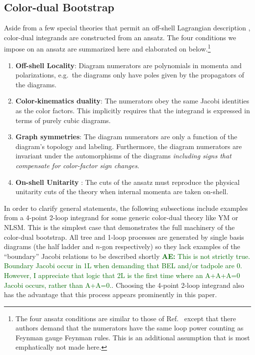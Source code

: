 \documentclass[11pt,letter]{article}
\newcommand{\ace}[1]{\textcolor{darkgreen}{\textbf{AE:}{ #1}}}
\newcommand{\eg}{e.g.~}
\begin{document}
\subsection{Color-dual Bootstrap}
\label{sec:bootstrap}

Aside from a few special theories that permit an off-shell Lagrangian
description \cite{Monteiro2011pc, Cheung:2016prv, Cheung:2021zvb,
  Cheung:2020djz, Ben-Shahar:2022ixa, Ben-Shahar:2021zww,
  Ben-Shahar:2021doh}, color-dual integrands are constructed from an
ansatz.  The four conditions we impose on an ansatz are summarized
here and elaborated on below.\footnote{The four ansatz conditions are
  similar to those of Ref.~\cite{Bern:2015ooa} except that there
  authors demand that the numerators have the same loop power counting
  as Feynman gauge Feynman rules.  This is an additional assumption
  that is most emphatically not made here.}
\begin{enumerate}
\item \textbf{Off-shell Locality}: Diagram numerators are polynomials
  in momenta and polarizations, \eg the diagrams only have poles given
  by the propagators of the diagrams.
\item \textbf{Color-kinematics duality}: The numerators obey the same
  Jacobi identities as the color factors.  This implicitly requires
  that the integrand is expressed in terms of purely cubic diagrams.
\item \textbf{Graph symmetries}: The diagram numerators are only a
  function of the diagram's topology and labeling.  Furthermore, the
  diagram numerators are invariant under the automorphisms of the
  diagrams \emph{including signs that compensate for color-factor sign
    changes}.
\item \textbf{On-shell Unitarity }: The cuts of the ansatz must
  reproduce the physical unitarity cuts of the theory when internal
  momenta are taken on-shell.
\end{enumerate}

In order to clarify general statements, the following subsections
include examples from a 4-point 2-loop integrand for some generic
color-dual theory like YM or NLSM.  This is the simplest case that
demonstrates the full machinery of the color-dual bootstrap.  All tree
and 1-loop processes are generated by single basis diagrams (the half
ladder and $n$-gon respectively) so they lack examples of the
``boundary'' Jacobi relations to be described shortly \ace{This is not
  strictly true.  Boundary Jacobi occur in 1L when demanding that BEL
  and/or tadpole are 0.  However, I appreciate that logic that 2L is
  the first time where an A+A+A=0 Jacobi occurs, rather than A+A=0.}.
Choosing the 4-point 2-loop integrand also has the advantage that this
process appears prominently in this paper.
\end{document}
